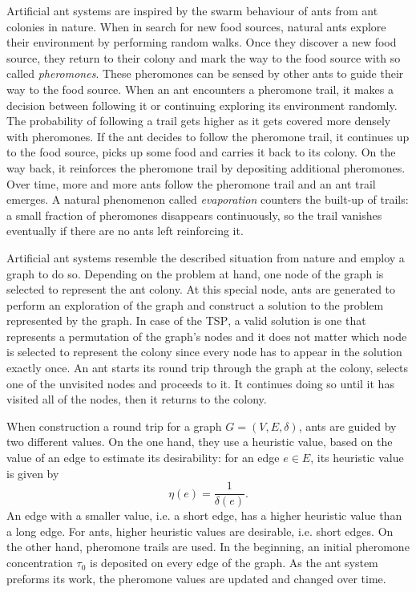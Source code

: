 Artificial ant systems are inspired by the swarm behaviour of ants from ant colonies in nature. When in search for new food sources, natural ants explore their environment by performing random walks. Once they discover a new food source, they return to their colony and mark the way to the food source with so called \textit{pheromones}. These pheromones can be sensed by other ants to guide their way to the food source. When an ant encounters a pheromone trail, it makes a decision between following it or continuing exploring its environment randomly. The probability of following a trail gets higher as it gets covered more densely with pheromones. If the ant decides to follow the pheromone trail, it continues up to the food source, picks up some food and carries it back to its colony. On the way back, it reinforces the pheromone trail by depositing additional pheromones. Over time, more and more ants follow the pheromone trail and an ant trail emerges. A natural phenomenon called \textit{evaporation} counters the built-up of trails: a small fraction of pheromones disappears continuously, so the trail vanishes eventually if there are no ants left reinforcing it.

Artificial ant systems resemble the described situation from nature and employ a graph to do so. Depending on the problem at hand, one node of the graph is selected to represent the ant colony. At this special node, ants are generated to perform an exploration of the graph and construct a solution to the problem represented by the graph. In case of the \textsc{TSP}, a valid solution is one that represents a permutation of the graph's nodes and it does not matter which node is selected to represent the colony since every node has to appear in the solution exactly once. An ant starts its round trip through the graph at the colony, selects one of the unvisited nodes and proceeds to it. It continues doing so until it has visited all of the nodes, then it returns to the colony.

When construction a round trip for a graph $G = \left( V, E, \delta \right)$, ants are guided by two different values. On the one hand, they use a heuristic value, based on the value of an edge to estimate its desirability: for an edge $e \in E$, its heuristic value is given by
\begin{equation}
  \label{eqn:eta}
  \eta \left( e \right) = \frac{1}{\delta \left( e \right)}.
\end{equation}
An edge with a smaller value, i.e. a short edge, has a higher heuristic value than a long edge. For ants, higher heuristic values are desirable, i.e. short edges. On the other hand, pheromone trails are used. In the beginning, an initial pheromone concentration $\tau_0$ is deposited on every edge of the graph. As the ant system preforms its work, the pheromone values are updated and changed over time.

